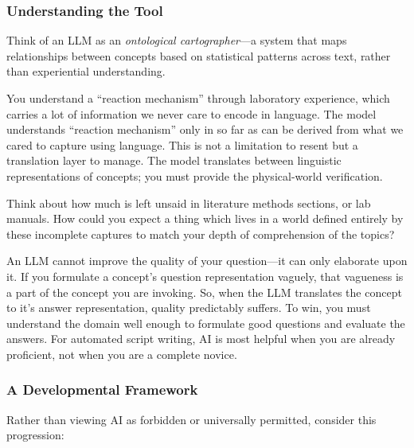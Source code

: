 \subsubsection*{Understanding the Tool}
Think of an LLM as an \textit{ontological cartographer}---a system that maps relationships between concepts based on statistical patterns across text, rather than experiential understanding. 

You understand a ``reaction mechanism'' through laboratory experience, which carries a lot of information we never care to encode in language. The model understands ``reaction mechanism'' only in so far as can be derived from what we cared to capture using language. This is not a limitation to resent but a translation layer to manage. The model translates between linguistic representations of concepts; you must provide the physical-world verification.

\begin{ponder}
Think about how much is left unsaid in literature methods sections, or lab manuals. How could you expect a thing which lives in a world defined entirely by these incomplete captures to match your depth of comprehension of the topics?
\end{ponder}

\begin{warning}
An LLM cannot improve the quality of your question---it can only elaborate upon it. If you formulate a concept's question representation vaguely, that vagueness is a part of the concept you are invoking. So, when the LLM translates the concept to it's answer representation, quality predictably suffers. To win, you must understand the domain well enough to formulate good questions and evaluate the answers. For automated script writing, AI is most helpful when you are already proficient, not when you are a complete novice.
\end{warning}

\subsubsection*{A Developmental Framework}

Rather than viewing AI as forbidden or universally permitted, consider this progression:

